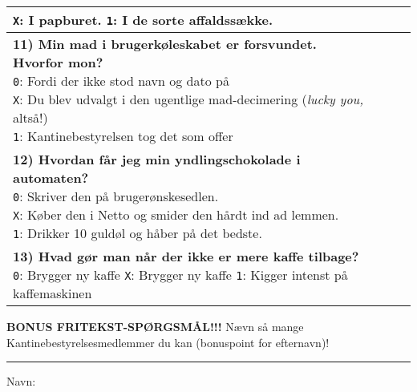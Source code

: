 \documentclass[a4paper]{article}
\begin{document}
\begin{center}
\begin{tabular}{|p{12cm}|p{0.2cm}|p{0.2cm}|p{0.2cm}|}
{  \texttt{X}: I papburet. \quad
  \texttt{1}: I de sorte affaldssække.
  \vspace{0.1cm}
} & & & \\\hline
\parbox{12cm}{
  \vspace{0.2cm}
  \textbf{11) Min mad i brugerkøleskabet er forsvundet. Hvorfor mon?}\\
  \texttt{0}: Fordi der ikke stod navn og dato på \quad \\
  \texttt{X}: Du blev udvalgt i den ugentlige mad-decimering (\textit{lucky you,} altså!) \quad \\
  \texttt{1}: Kantinebestyrelsen tog det som offer
  \vspace{0.1cm}
} & & & \\\hline
\parbox{12cm}{
  \vspace{0.2cm}
  \textbf{12) Hvordan får jeg min yndlingschokolade i automaten?} \\
  \texttt{0}: Skriver den på brugerønskesedlen. \\
  \texttt{X}: Køber den i Netto og smider den hårdt ind ad lemmen. \\
  \texttt{1}: Drikker 10 guldøl og håber på det bedste.
  \vspace{0.1cm}
} & & & \\\hline
\parbox{12cm}{
  \vspace{0.2cm}
  \textbf{13) Hvad gør man når der ikke er mere kaffe tilbage?}\\
  \texttt{0}:  Brygger ny kaffe \quad
  \texttt{X}:  Brygger ny kaffe \quad
  \texttt{1}:  Kigger intenst på kaffemaskinen
  \vspace{0.1cm}
} & & & \\\hline
\end{tabular}

\vspace{0.5cm}

{\textbf{BONUS FRITEKST-SPØRGSMÅL!!!} Nævn så mange Kantinebestyrelsesmedlemmer
    du kan (bonuspoint for efternavn)!
\\ \vspace{1cm} \rule{5cm}{0.4pt}}

\vspace{0.5cm}
{\large Navn: \hrulefill}
\end{center}
\end{document}
